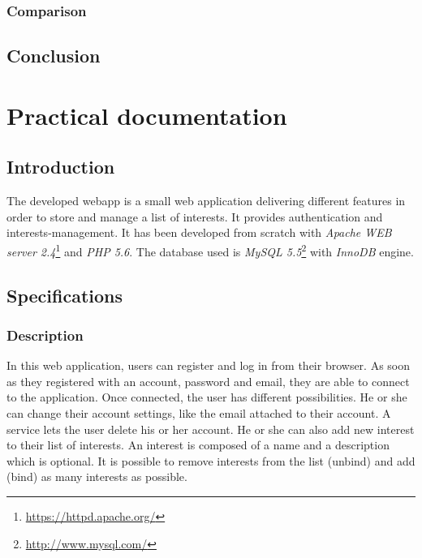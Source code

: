 \documentclass[a4paper,11pt,openany]{report}
\begin{document}
  \subsection{Comparison}
  
  
  
  \section{Conclusion}

  
  
\appendix
{}

\chapter{Practical documentation} \label{app:practical_documentation}

\section{Introduction}
The developed webapp is a small web application delivering different features 
in order to store and manage a list of interests. It provides authentication and 
interests-management. It has been developed from scratch with \textit{Apache 
WEB server 2.4}\footnote{\url{https://httpd.apache.org/}} and \textit{PHP 5.6}. 
The database used is \textit{MySQL 5.5}\footnote{\url{http://www.mysql.com/}} with 
\textit{InnoDB} engine.

\section{Specifications}

\subsection{Description}

In this web application, users can register and log in from their browser. As soon as 
they registered with an account, password and email, they are able to connect to 
the application. Once connected, the user has different possibilities. He or she can 
change their account settings, like the email attached to their account. A service lets the 
user delete his or her account. He or she can also add new interest to their list of 
interests. An interest is composed of a name and a description which is optional. It is 
possible to remove interests from the list (unbind) and add (bind) as many interests as 
possible.
\end{document}
